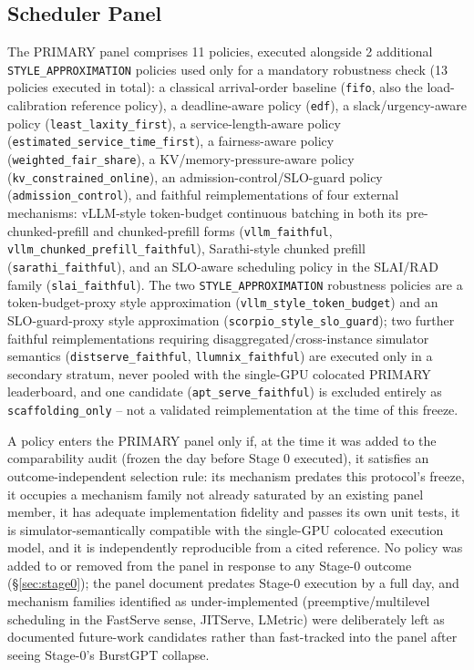 \documentclass[sn-basic,Numbered,pdflatex]{sn-jnl}
\begin{document}
\subsection{Scheduler Panel}
\label{sec:panel}

The PRIMARY panel comprises 11 policies, executed alongside 2 additional
\texttt{STYLE\_APPROXIMATION} policies used only for a mandatory robustness
check (13 policies executed in total): a classical arrival-order baseline
(\texttt{fifo}, also the load-calibration reference policy), a
deadline-aware policy (\texttt{edf}), a slack/urgency-aware policy
(\texttt{least\_laxity\_first}), a service-length-aware policy
(\texttt{estimated\_service\_time\_first}), a fairness-aware policy
(\texttt{weighted\_fair\_share}), a KV/memory-pressure-aware policy
(\texttt{kv\_constrained\_online}), an admission-control/SLO-guard policy
(\texttt{admission\_control}), and faithful reimplementations of four
external mechanisms: vLLM-style token-budget continuous batching in both
its pre-chunked-prefill and chunked-prefill forms
(\texttt{vllm\_faithful}, \texttt{vllm\_chunked\_prefill\_faithful}),
Sarathi-style chunked prefill (\texttt{sarathi\_faithful}), and an
SLO-aware scheduling policy in the SLAI/RAD family
(\texttt{slai\_faithful}). The two \texttt{STYLE\_APPROXIMATION} robustness
policies are a token-budget-proxy style approximation
(\texttt{vllm\_style\_token\_budget}) and an SLO-guard-proxy style
approximation (\texttt{scorpio\_style\_slo\_guard}); two further faithful
reimplementations requiring disaggregated/cross-instance simulator
semantics (\texttt{distserve\_faithful}, \texttt{llumnix\_faithful}) are
executed only in a secondary stratum, never pooled with the single-GPU
colocated PRIMARY leaderboard, and one candidate
(\texttt{apt\_serve\_faithful}) is excluded entirely as
\texttt{scaffolding\_only} -- not a validated reimplementation at the time
of this freeze.

A policy enters the PRIMARY panel only if, at the time it was added to the
comparability audit (frozen the day before Stage 0 executed), it satisfies
an outcome-independent selection rule: its mechanism predates this
protocol's freeze, it occupies a mechanism family not already saturated by
an existing panel member, it has adequate implementation fidelity and
passes its own unit tests, it is simulator-semantically compatible with the
single-GPU colocated execution model, and it is independently reproducible
from a cited reference. No policy was added to or removed from the panel in
response to any Stage-0 outcome (\S\ref{sec:stage0}); the panel document
predates Stage-0 execution by a full day, and mechanism families identified
as under-implemented (preemptive/multilevel scheduling in the FastServe
sense, JITServe, LMetric) were deliberately left as documented future-work
candidates rather than fast-tracked into the panel after seeing Stage-0's
BurstGPT collapse.
\end{document}
